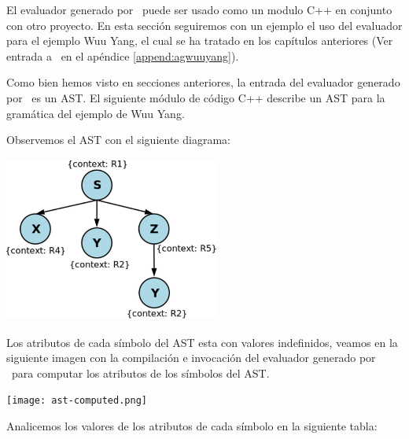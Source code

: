 El evaluador generado por \maggen\ puede ser usado como un modulo C++ en conjunto con otro proyecto. En esta sección seguiremos con un ejemplo el uso del evaluador para el ejemplo Wuu Yang, el cual se ha tratado en los capítulos anteriores (Ver entrada a \maggen\ en el apéndice \ref{append:agwuuyang}).

Como bien hemos visto en secciones anteriores, la entrada del evaluador generado por \maggen\ es un AST. El siguiente módulo de código C++ describe un AST para la gramática del ejemplo de Wuu Yang.



Observemos el AST con el siguiente diagrama:

\begin{center}
\includegraphics[width=200pt,height=154pt]{ast.png}
\end{center}

Los atributos de cada símbolo del AST esta con valores indefinidos, veamos en la siguiente imagen con la compilación e invocación del evaluador generado por \maggen\ para computar los atributos de los símbolos del AST.

\begin{center}
\texttt{[image: ast-computed.png]}
\end{center} 

Analicemos los valores de los atributos de cada símbolo en la siguiente tabla:

